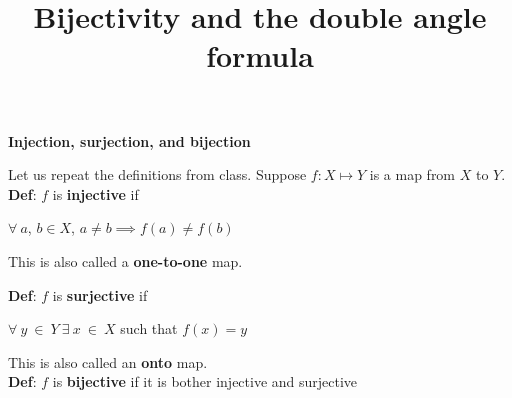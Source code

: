 \documentclass[a4paper,12pt]{article}
\begin{document}
\title {Bijectivity and the double angle formula}
\maketitle
		

\centerline{\textbf{Injection, surjection, and bijection}}

\bigskip
Let us repeat the definitions from class. Suppose $f:X \mapsto Y$ is a map from $X$ to $Y$.
\\

\textbf{Def}: $f$ is \textbf{injective} if
\begin{center}$\forall \  a$, $b \in X$, $a \ne b \implies f(a) \ne f(b)$\end{center}
This is also called a \textbf{one-to-one} map. 

\textbf{Def}: $f$ is \textbf{surjective} if \\
\begin{center} $\forall \ y\  \in \  Y\  \exists \  x\  \in \  X$ such that $f(x) = y$ \end{center}
This is also called an \textbf{onto} map.
\\
\textbf{Def}: $f$ is \textbf{bijective} if it is bother injective and surjective

\medskip
\end{document}
